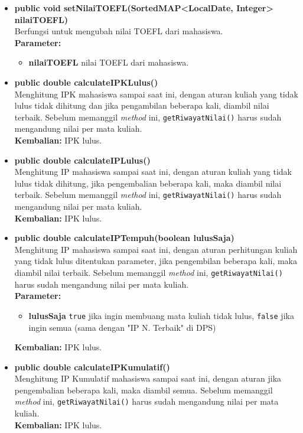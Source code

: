 \begin{enumerate}
\begin{itemize}
\begin{itemize}
					\item \textbf{public void setNilaiTOEFL(SortedMAP<LocalDate, Integer> nilaiTOEFL)}\\
						Berfungsi untuk mengubah nilai TOEFL dari mahasiswa.\\
						\textbf{Parameter:}
						\begin{itemize}
							\item \textbf{nilaiTOEFL} nilai TOEFL dari mahasiswa.
						\end{itemize}
					 
					 \item \textbf{public double calculateIPKLulus()}\\
						Menghitung IPK mahasiswa sampai saat ini, dengan aturan kuliah yang tidak lulus tidak dihitung dan jika pengambilan beberapa kali, diambil nilai terbaik. Sebelum memanggil \textit{method} ini, \texttt{getRiwayatNilai()} harus sudah mengandung nilai per mata kuliah.\\
						\textbf{Kembalian:} IPK lulus.
					
					\item \textbf{public double calculateIPLulus()}\\
						Menghitung IP mahasiswa sampai saat ini, dengan aturan kuliah yang tidak lulus tidak dihitung, jika pengembalian beberapa kali, maka diambil nilai terbaik. Sebelum memanggil \textit{method} ini, \texttt{getRiwayatNilai()} harus sudah mengandung nilai per mata kuliah.\\
						\textbf{Kembalian:}  IPK lulus.
					
					\item \textbf{public double calculateIPTempuh(boolean lulusSaja)}\\
						Menghitung IP mahasiswa sampai saat ini, dengan aturan perhitungan kuliah yang tidak lulus ditentukan parameter, jika pengembilan beberapa kali, maka diambil nilai terbaik. Sebelum memanggil \textit{method} ini, \texttt{getRiwayatNilai()} harus sudah mengandung nilai per mata kuliah.\\
						\textbf{Parameter:} 
						\begin{itemize}
							\item \textbf{lulusSaja} \texttt{true} jika ingin membuang mata kuliah tidak lulus, \texttt{false} jika ingin semua (sama dengan "IP N. Terbaik" di DPS)
						\end{itemize}
						\textbf{Kembalian:}  IPK lulus.
					
					\item \textbf{public double calculateIPKumulatif()}\\
						Menghitung IP Kumulatif mahasiswa sampai saat ini, dengan aturan jika pengembalian beberapa kali, maka diambil semua. Sebelum memanggil \textit{method} ini, \texttt{getRiwayatNilai()} harus sudah mengandung nilai per mata kuliah.\\
						\textbf{Kembalian:}  IPK lulus.
						

\end{itemize}
\end{itemize}
\end{enumerate}
